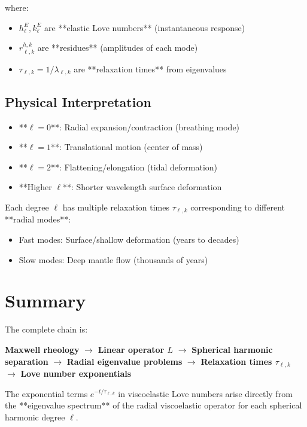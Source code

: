 \documentclass{article}
\begin{document}
where:
\begin{itemize}
\item $h_\ell^E, k_\ell^E$ are **elastic Love numbers** (instantaneous response)
\item $r_{\ell,k}^{h,k}$ are **residues** (amplitudes of each mode)
\item $\tau_{\ell,k} = 1/\lambda_{\ell,k}$ are **relaxation times** from eigenvalues
\end{itemize}

\subsection{Physical Interpretation}

\begin{itemize}
\item **$\ell = 0$**: Radial expansion/contraction (breathing mode)
\item **$\ell = 1$**: Translational motion (center of mass)
\item **$\ell = 2$**: Flattening/elongation (tidal deformation)
\item **Higher $\ell$**: Shorter wavelength surface deformation
\end{itemize}

Each degree $\ell$ has multiple relaxation times $\tau_{\ell,k}$ corresponding to different **radial modes**:
\begin{itemize}
\item Fast modes: Surface/shallow deformation (years to decades)
\item Slow modes: Deep mantle flow (thousands of years)
\end{itemize}

\section{Summary}

The complete chain is:
\begin{center}
\textbf{Maxwell rheology} $\rightarrow$ \textbf{Linear operator $L$} $\rightarrow$ \textbf{Spherical harmonic separation} $\rightarrow$ \textbf{Radial eigenvalue problems} $\rightarrow$ \textbf{Relaxation times $\tau_{\ell,k}$} $\rightarrow$ \textbf{Love number exponentials}
\end{center}

The exponential terms $e^{-t/\tau_{\ell,k}}$ in viscoelastic Love numbers arise directly from the **eigenvalue spectrum** of the radial viscoelastic operator for each spherical harmonic degree $\ell$.
\end{document}
